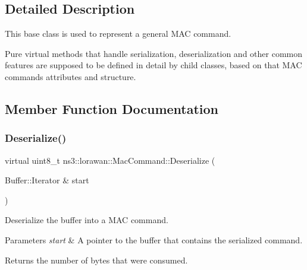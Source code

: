 \subsection{Detailed Description}
This base class is used to represent a general M\+AC command.

Pure virtual methods that handle serialization, deserialization and other common features are supposed to be defined in detail by child classes, based on that M\+AC command\textquotesingle{}s attributes and structure. 

\subsection{Member Function Documentation}
\mbox{\label{classns3_1_1lorawan_1_1MacCommand_af12d223a71a67196bce498f1240eda75}} 
\subsubsection{\texorpdfstring{Deserialize()}{Deserialize()}}
{\footnotesize\ttfamily virtual uint8\+\_\+t ns3\+::lorawan\+::\+Mac\+Command\+::\+Deserialize (\begin{DoxyParamCaption}\item[{Buffer\+::\+Iterator \&}]{start }\end{DoxyParamCaption})\hspace{0.3cm}{\ttfamily [pure virtual]}}

Deserialize the buffer into a M\+AC command.


\begin{DoxyParams}{Parameters}
{\em start} & A pointer to the buffer that contains the serialized command. \\
\hline
\end{DoxyParams}
\begin{DoxyReturn}{Returns}
the number of bytes that were consumed. 
\end{DoxyReturn}


